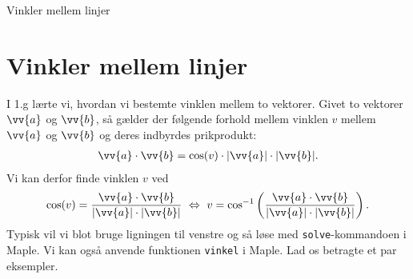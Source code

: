 \begin{center}
\Huge
Vinkler mellem linjer
\end{center}

\section*{Vinkler mellem linjer}


I 1.g lærte vi, hvordan vi bestemte vinklen mellem to vektorer. Givet to vektorer $\vv{a}$ og $\vv{b}$, så gælder der følgende forhold mellem vinklen $v$ mellem $\vv{a}$ og $\vv{b}$ og deres indbyrdes prikprodukt:
\begin{align*}
	\vv{a}\cdot \vv{b} = \cos(v)\cdot |\vv{a}|\cdot |\vv{b}|.
\end{align*}
Vi kan derfor finde vinklen $v$ ved 
\begin{align*}
	\cos(v) = \frac{\vv{a}\cdot \vv{b}}{|\vv{a}|\cdot |\vv{b}|} \ \Leftrightarrow \ v
	= \cos^{-1}\left(\frac{\vv{a}\cdot \vv{b}}{|\vv{a}|\cdot |\vv{b}|}\right).
\end{align*}
Typisk vil vi blot bruge ligningen til venstre og så løse med \texttt{solve}-kommandoen i Maple. Vi kan også anvende funktionen \texttt{vinkel} i Maple. 
Lad os betragte et par eksempler.
